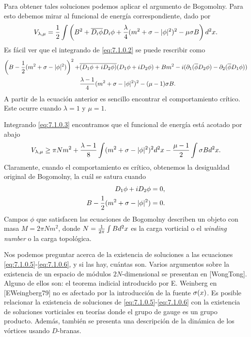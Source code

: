 Para obtener tales soluciones podemos aplicar el argumento de Bogomolny. Para esto debemos mirar al funcional de energía correspondiente, dado por
\begin{align}
	V_{\lambda,\mu} = \frac{1}{2}\int\left(B^2+\overline{D_i\phi}D_i\phi+\frac{\lambda}{4}(m^2+\sigma-|\phi|^2)^2-\mu\sigma B\right)d^2x. \label{eq:7.1.0.2}
\end{align}
Es fácil ver que el integrando de \eqref{eq:7.1.0.2} se puede rescribir como
\begin{align}
	\left(B-\frac{1}{2}(m^2+\sigma-|\phi|^2)\right)^2+ & \overline{(D_1\phi+iD_2\phi)}(D_1\phi+iD_2\phi)+Bm^2-i(\partial_1(\overline\phi D_2\phi)-\partial_2(\overline\phi D_1\phi))\nonumber \\
	                                  & \frac{\lambda-1}{4}(m^2+\sigma-|\phi|^2)^2-(\mu-1)\sigma B. \label{eq:7.1.0.3}
\end{align}
A partir de la ecuación anterior es sencillo encontrar el comportamiento crítico. Este ocurre cuando $\lambda=1$ y $\mu=1$.

Integrando \eqref{eq:7.1.0.3} encontramos que el funcional de energía está acotado por abajo
\begin{align}
	V_{\lambda,\mu}\geq \pi Nm^2+\frac{\lambda-1}{8}\int (m^2+\sigma-|\phi|^2)^2d^2x-\frac{\mu-1}{2}\int\sigma Bd^2x.
\end{align}
Claramente, cuando el comportamiento es crítico, obtenemos la desigualdad original de Bogomolny, la cuál se satura cuando
\begin{align}
	D_1\phi+iD_2\phi          & =0, \label{eq:7.1.0.5} \\
	B-\frac{1}{2}(m^2+\sigma-|\phi|^2) & =0. \label{eq:7.1.0.6}
\end{align}
Campos $\phi$ que satisfacen las ecuaciones de Bogomolny describen un objeto con masa $M=2\pi Nm^2$, donde $N=\frac{1}{2\pi}\int B d^2x$ es la carga vorticial o el \emph{winding number} o la carga topológica.

Nos podemos preguntar acerca de la existencia de soluciones a las ecuaciones \eqref{eq:7.1.0.5}-\eqref{eq:7.1.0.6}, y si las hay, cuántas son. Varios argumentos sobre la existencia de un espacio de módulos $2N$-dimensional se presentan en [WongTong]. Alguno de ellos son: el teorema indicial introducido por E. Weinberg en [EWeingberg79] no es afectado por la introducción de la fuente $\sigma(x)$. Es posible relacionar la existencia de soluciones de \eqref{eq:7.1.0.5}-\eqref{eq:7.1.0.6} con la existencia de soluciones vorticiales en teorías donde el grupo de gauge es un grupo producto. Además, también se presenta una descripción de la dinámica de los vórtices usando $D$-branas.

